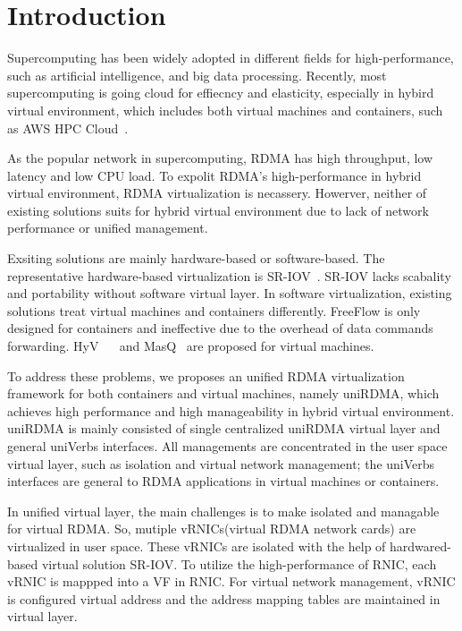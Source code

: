 \section{Introduction}
 Supercomputing has been widely adopted in different fields for high-performance, such as artificial intelligence, and big data processing. Recently, most supercomputing is going cloud for effiecncy and elasticity, especially in hybird virtual environment, which includes both virtual machines and containers, such as AWS HPC Cloud~\cite{aws-hpc}. 

As the popular network in supercomputing, RDMA has high throughput, low latency and low CPU load. To expolit RDMA's high-performance in hybrid virtual environment, RDMA virtualization is necassery. Howerver, neither of existing solutions suits for hybrid virtual environment due to lack of network performance or unified management.

Exsiting solutions are mainly hardware-based or software-based. The representative hardware-based virtualization is SR-IOV~\cite{sr-iov}. SR-IOV lacks scabality and portability without software virtual layer. In software virtualization, existing solutions treat virtual machines and containers differently. FreeFlow is only designed for containers and ineffective due to the overhead of data commands forwarding.  HyV~\cite{pfefferle2015hybrid} ~\cite{pfefferle2014vverbs} and MasQ~\cite{he2020masq} are proposed for virtual machines.

To address these problems, we proposes an unified RDMA virtualization framework for both containers and virtual machines, namely uniRDMA, which achieves high performance and high manageability in hybrid virtual environment. uniRDMA is mainly consisted of single centralized uniRDMA virtual layer and general uniVerbs interfaces. All managements are concentrated in the user space virtual layer, such as isolation and virtual network management; the uniVerbs interfaces are general to RDMA applications in virtual machines or containers. 

In unified virtual layer, the main challenges is to make isolated and managable for virtual RDMA. So, mutiple vRNICs(virtual RDMA network cards) are virtualized in user space. These vRNICs are isolated with the help of hardwared-based virtual solution SR-IOV. To utilize the high-performance of RNIC, each vRNIC is mappped into a VF in RNIC. For virtual network management, vRNIC is configured virtual address and the address mapping tables are maintained in virtual layer.

